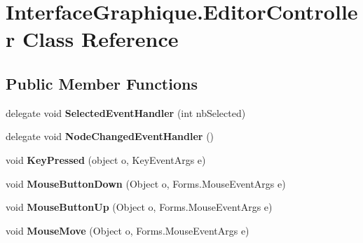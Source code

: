 \hypertarget{class_interface_graphique_1_1_editor_controller}{}\section{Interface\+Graphique.\+Editor\+Controller Class Reference}
\label{class_interface_graphique_1_1_editor_controller}
\subsection*{Public Member Functions}
\begin{DoxyCompactItemize}
\item 
\hypertarget{class_interface_graphique_1_1_editor_controller_a5dd318fe9ffbc3d4a9515a3c50799f90}{}delegate void {\bfseries Selected\+Event\+Handler} (int nb\+Selected)\label{class_interface_graphique_1_1_editor_controller_a5dd318fe9ffbc3d4a9515a3c50799f90}

\item 
\hypertarget{class_interface_graphique_1_1_editor_controller_aeac82bbe20161320c61ad3d6f6c09439}{}delegate void {\bfseries Node\+Changed\+Event\+Handler} ()\label{class_interface_graphique_1_1_editor_controller_aeac82bbe20161320c61ad3d6f6c09439}

\item 
\hypertarget{class_interface_graphique_1_1_editor_controller_a9e1a8125231bfc91d78a58494eea9b52}{}void {\bfseries Key\+Pressed} (object o, Key\+Event\+Args e)\label{class_interface_graphique_1_1_editor_controller_a9e1a8125231bfc91d78a58494eea9b52}

\item 
\hypertarget{class_interface_graphique_1_1_editor_controller_a012354c95b60c84f57158c79f277f48a}{}void {\bfseries Mouse\+Button\+Down} (Object o, Forms.\+Mouse\+Event\+Args e)\label{class_interface_graphique_1_1_editor_controller_a012354c95b60c84f57158c79f277f48a}

\item 
\hypertarget{class_interface_graphique_1_1_editor_controller_a6d5271f6ddfdec825e50a5a573cc3cd2}{}void {\bfseries Mouse\+Button\+Up} (Object o, Forms.\+Mouse\+Event\+Args e)\label{class_interface_graphique_1_1_editor_controller_a6d5271f6ddfdec825e50a5a573cc3cd2}

\item 
\hypertarget{class_interface_graphique_1_1_editor_controller_a3125ab438e444b57565d9a1df1e47752}{}void {\bfseries Mouse\+Move} (Object o, Forms.\+Mouse\+Event\+Args e)\label{class_interface_graphique_1_1_editor_controller_a3125ab438e444b57565d9a1df1e47752}


\end{DoxyCompactItemize}
